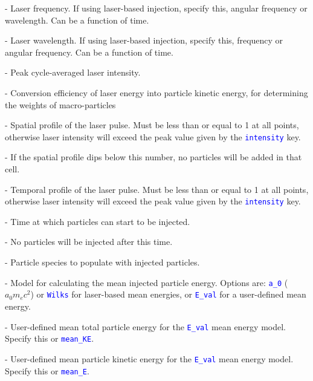 \documentclass[12pt]{article}
\numberwithin{equation}{section}
\begin{document}
\bigskip {\large\textcolor{blue}{frequency}} - Laser frequency. If using laser-based injection, specify this, angular frequency or wavelength. Can be a function of time.

\bigskip {\large\textcolor{blue}{wavelength}} - Laser wavelength. If using laser-based injection, specify this, frequency or angular frequency. Can be a function of time.

\bigskip {\large\textcolor{blue}{intensity}} - Peak cycle-averaged laser intensity.

\bigskip {\large\textcolor{blue}{efficiency}} - Conversion efficiency of laser energy into particle kinetic energy, for determining the weights of macro-particles

\bigskip {\large\textcolor{blue}{profile}} - Spatial profile of the laser pulse. Must be less than or equal to 1 at all points, otherwise laser intensity will exceed the peak value given by the \textcolor{blue}{\texttt{intensity}} key.

\bigskip {\large\textcolor{blue}{profile\_min}} - If the spatial profile dips below this number, no particles will be added in that cell.       

\bigskip {\large\textcolor{blue}{t\_profile}} - Temporal profile of the laser pulse. Must be less than or equal to 1 at all points, otherwise laser intensity will exceed the peak value given by the \textcolor{blue}{\texttt{intensity}} key.

\bigskip {\large\textcolor{blue}{t\_start}} - Time at which particles can start to be injected.

\bigskip {\large\textcolor{blue}{t\_end}} - No particles will be injected after this time.

\bigskip {\large\textcolor{blue}{species}} - Particle species to populate with injected particles.

\bigskip {\large\textcolor{blue}{mean\_energy}} - Model for calculating the mean injected particle energy. Options are: \textcolor{blue}{\texttt{a\_0}} ($a_0 m_e c^2$) or \textcolor{blue}{\texttt{Wilks}} for laser-based mean energies, or \textcolor{blue}{\texttt{E\_val}} for a user-defined mean energy.

\bigskip {\large\textcolor{blue}{mean\_E}} - User-defined mean total particle energy for the \textcolor{blue}{\texttt{E\_val}} mean energy model. Specify this or \textcolor{blue}{\texttt{mean\_KE}}.

\bigskip {\large\textcolor{blue}{mean\_KE}} - User-defined mean particle kinetic energy for the \textcolor{blue}{\texttt{E\_val}} mean energy model. Specify this or \textcolor{blue}{\texttt{mean\_E}}.
\end{document}
